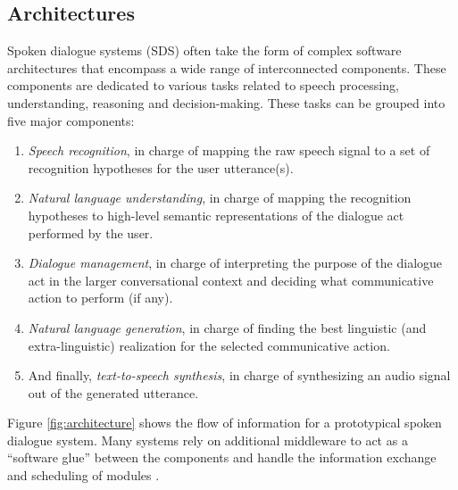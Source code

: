  \subsection{Architectures}
\label{sec:architectures}

Spoken dialogue systems (SDS) often take the form of complex software architectures that encompass a wide range of interconnected components. These components are dedicated to various tasks related to speech processing, understanding, reasoning and decision-making. These tasks can be grouped into five major components: 
\begin{enumerate}
\item \textit{Speech recognition}, in charge of mapping the raw speech signal to a set of recognition hypotheses for the user utterance(s).
\item \textit{Natural language understanding}, in charge of mapping the recognition hypotheses to high-level semantic representations of the dialogue act performed by the user.
\item \textit{Dialogue management}, in charge of interpreting the purpose of the dialogue act in the larger conversational context and deciding what communicative action to perform (if any).
\item \textit{Natural language generation}, in charge of finding the best linguistic (and extra-linguistic) realization for the selected communicative action.
\item And finally, \textit{text-to-speech synthesis}, in charge of synthesizing an audio signal out of the generated utterance.
 \end{enumerate}
 
 Figure \ref{fig:architecture} shows the flow of information for a prototypical spoken dialogue system. Many systems rely on additional middleware to act as a ``software glue'' between the components and handle the information exchange and scheduling of modules \citep{jaspis2004,Herzog:2004,Bohus:2009,schlangen2010}.
   
